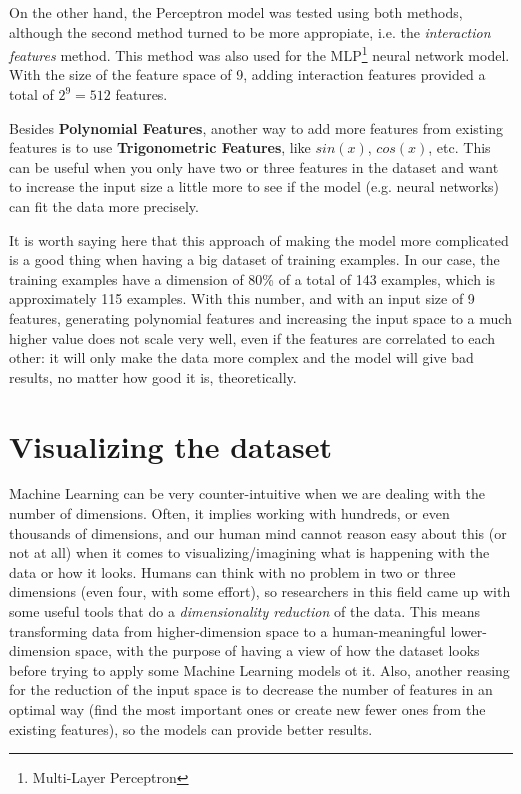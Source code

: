 On the other hand, the Perceptron model was tested using both methods, although the 
second method turned to be more appropiate, i.e. the {\it interaction features} method. 
This method was also used for the MLP\footnote{Multi-Layer Perceptron} neural network 
model. With the size of the feature space of 9, adding interaction features 
provided a total of $2^{9}=512$ features.

Besides {\bf Polynomial Features}, another way to add more features from 
existing features is to use {\bf Trigonometric Features}, like $sin(x)$, 
$cos(x)$, etc. This can be useful when you only have two or three features in the 
dataset and want to increase the input size a little more to see if the model 
(e.g. neural networks) can fit the data more precisely.

It is worth saying here that this approach of making the model more complicated 
is a good thing when having a big dataset of training examples. In our case, the 
training examples have a dimension of 80\% of a total of 143 examples, which is 
approximately 115 examples. With this number, and with an input size of 9 features, 
generating polynomial features and increasing the input space to a much higher 
value does not scale very well, even if the features are correlated to each other: 
it will only make the data more complex and the model will give bad results, 
no matter how good it is, theoretically. 

\section{Visualizing the dataset}

Machine Learning can be very counter-intuitive when we are dealing with 
the number of dimensions. Often, it implies working with hundreds, or even 
thousands of dimensions, and our human mind cannot reason easy about this 
(or not at all) when it comes to visualizing/imagining what is happening 
with the data or how it looks. Humans can think with no problem in two 
or three dimensions (even four, with some effort), so researchers in this 
field came up with some useful tools that do a {\it dimensionality reduction} 
of the data. This means transforming data from higher-dimension space to 
a human-meaningful lower-dimension space, with the purpose of having a view 
of how the dataset looks before trying to apply some Machine Learning models 
ot it. Also, another reasing for the reduction of the input space is to decrease 
the number of features in an optimal way (find the most important ones or create 
new fewer ones from the existing features), so the models can provide better 
results.

